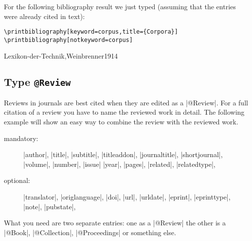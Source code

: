 \documentclass[a4paper,
10pt,
greek,
french,
spanish,
italian,
ngerman,
english
]{ltxdoc}
\begin{document}
For the following bibliography result we just typed (assuming that the entries were already cited in text):
\begin{lstlisting}
\printbibliography[keyword=corpus,title={Corpora}]
\printbibliography[notkeyword=corpus]
\end{lstlisting}

\begin{refsection}
\begin{bibbsp}{Lexikon-der-Technik,Weinbrenner1914}
\nocite{Lexikon-der-Technik,Weinbrenner1914}
\printbibliography[keyword=corpus,title={Corpora}]
\printbibliography[notkeyword=corpus]
\end{bibbsp}
\end{refsection}


 
\subsection{Type \texttt{@Review}}\label{review}
Reviews in journals are best cited when they are edited as a |@Review|.
For a full citation of a review you have to name the reviewed work in detail.
The following example will show an easy way to combine the review with the reviewed work.

\begin{description}
\item[mandatory:] 
|author|, |title|, |subtitle|, |titleaddon|,
|journaltitle|, |shortjournal|, |volume|, |number|, |issue|
|year|, |pages|, 
|related|, |relatedtype|,
\item[optional:]
|translator|, |origlanguage|,
|doi|, |url|, |urldate|, |eprint|, |eprinttype|, |note|, |pubstate|, 
 \end{description}

What you need are two separate entries: one as a |@Review| the other is a |@Book|, |@Collection|, |@Proceedings| or something else.
\end{document}
